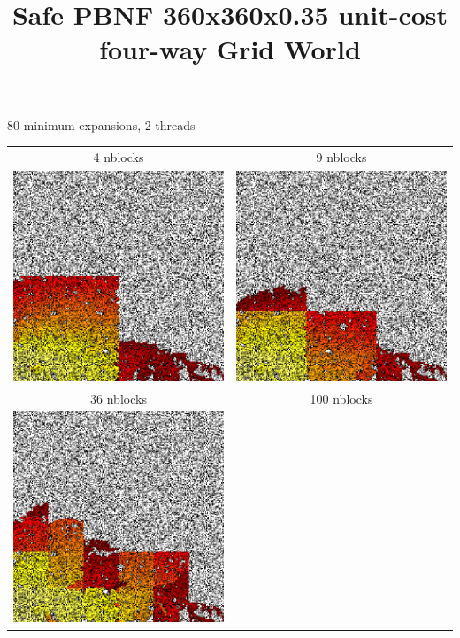 \documentclass{article}
\title{Safe PBNF 360x360x0.35 unit-cost four-way Grid World}
\date{}
\begin{document}
\maketitle

\begin{center}
80 minimum expansions, 2 threads
\begin{tabular}{cc}
4 nblocks & 9 nblocks \\
\includegraphics[width=3.2in]{safepbnf-80min-2threads-4nblocks-unit-four-035-360-360}
&
\includegraphics[width=3.2in]{safepbnf-80min-2threads-9nblocks-unit-four-035-360-360}
\\
36 nblocks & 100 nblocks \\
\includegraphics[width=3.2in]{safepbnf-80min-2threads-36nblocks-unit-four-035-360-360}

\end{tabular}
\end{center}
\end{document}
